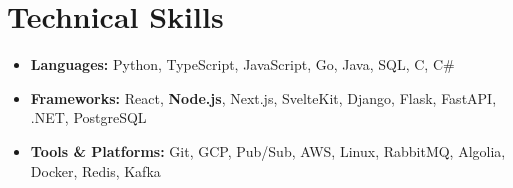 \documentclass[letterpaper,11pt]{article}
\newcommand{\resumeItemThin}[1]{
  \item{
    {#1 \vspace{-5pt}}
  }
}
\newcommand{\resumeItemListStart}{\vspace{3pt}\begin{itemize}[leftmargin=0.15in, rightmargin=0.15in]}
\newcommand{\resumeItemListEnd}{\end{itemize}\vspace{-5pt}}
\begin{document}

\section{Technical Skills}
\resumeItemListStart
\resumeItemThin{\textbf{Languages: }{Python, TypeScript, JavaScript, Go, Java, SQL, C, C\#}}\\
\resumeItemThin{\textbf{Frameworks: } React, \textbf{Node.js}, Next.js, SvelteKit, Django, Flask, FastAPI, .NET, PostgreSQL}\\
\resumeItemThin{\textbf{Tools \& Platforms: }{Git, GCP, Pub/Sub, AWS, Linux, RabbitMQ, Algolia, Docker, Redis, Kafka}}\\
\resumeItemListEnd
\end{document}
